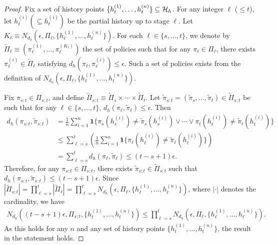 \begin{proof}
Fix a set of history points $\{h_{t}^{(1)},\ldots,h_{t}^{(n)}\} \subseteq \mathcal{H}_h$. For any integer $\ell$ ($\leq t$), let $h_{\ell}^{(i)} (\subseteq h_{t}^{(i)})$ be the partial history up to stage $\ell$. Let $K_\ell  \equiv  N_{d_h}(\epsilon,\Pi_\ell,\{h_{\ell}^{(1)},\ldots,h_{\ell}^{(n)}\})$. For each $\ell\in \{s,\ldots,t\}$, we denote by $\widetilde{\Pi}_{\ell} \equiv \left(\pi_{\ell}^{(1)},\ldots,\pi_{\ell}^{(K_{\ell})}\right)$ the set of policies such that for any $\pi_{\ell} \in \Pi_{\ell}$, there exists $\pi_{\ell}^{(i)} \in \widetilde{\Pi}_{\ell}$ satisfying $d_{h}(\pi_{\ell},\pi_{\ell}^{(i)}) \leq \epsilon$. Such a set of policies exists from the definition of $N_{d_h}(\epsilon,\Pi_\ell,\{h_{\ell}^{(1)},\ldots,h_{\ell}^{(n)}\})$.

Fix $\pi_{s:t} \in \Pi_{s:t}$, and define $\widetilde{\Pi}_{s:t} \equiv \widetilde{\Pi}_{s}\times \cdots \times \widetilde{\Pi}_{t}$. Let $\tilde{\pi}_{s:t}=(\tilde{\pi}_s,\ldots,\tilde{\pi}_t) \in\widetilde{\Pi}_{s:t}$ be such that for any $\ell \in \{s,\ldots,t\}$, $d_{h}(\pi_{\ell},\tilde{\pi}_{\ell}) \leq \epsilon$. Then
\begin{align*}
    d_h(\pi_{s:t},\tilde{\pi}_{s:t}) & = \frac{1}{n}\sum_{i=1}^{n}\mathbf{1}\{\pi_{s}(h_{s}^{(i)})\neq \tilde{\pi}_{s}(h_{s}^{(i)}) \vee \cdots \vee \pi_{t}(h_{t}^{(i)})\neq \tilde{\pi}_{t}(h_{t}^{(i)})\} \\
    & \leq \sum_{\ell=s}^{t} \left(\frac{1}{n}\sum_{i=1}^{n}\mathbf{1}\{\pi_{\ell}(h_{\ell}^{(i)})\neq \tilde{\pi}_{\ell}(h_{\ell}^{(i)})\}\right)\\
    &= \sum_{\ell=s}^{t} d_h(\pi_{\ell},\tilde{\pi}_{\ell}) \leq (t-s+1)\epsilon.
\end{align*}
Therefore, for any $\pi_{s:t} \in \Pi_{s:t}$, there exists $\tilde{\pi}_{s:t}\in \widetilde{\Pi}_{s:t}$ such that $d_h(\pi_{s:t},\tilde{\pi}_{s:t}) \leq (t-s+1)\epsilon$. Since $\left|\widetilde{\Pi}_{s:t}\right| = \prod_{\ell=s}^{t}\left|\widetilde{\Pi}_{\ell}\right|=\prod_{\ell=s}^{t}N_{d_h}(\epsilon,\Pi_\ell,\{h_{\ell}^{(1)},\ldots,h_{\ell}^{(n)}\})$, where $|\cdot|$ denotes the cardinality, we have
\begin{align*}
    N_{d_h}\left((t-s+1)\epsilon,\Pi_{s:t},\{h_{t}^{(1)},\ldots,h_{t}^{(n)}\}\right) \leq \prod_{\ell=s}^{t}N_{d_h}\left(\epsilon,\Pi_\ell,\{h_{\ell}^{(1)},\ldots,h_{\ell}^{(n)}\}\right).
\end{align*}
As this holds for any $n$ and any set of history points $\{h_{t}^{(1)},\ldots,h_{t}^{(n)}\}$, the result in the statement holds.
\end{proof}


